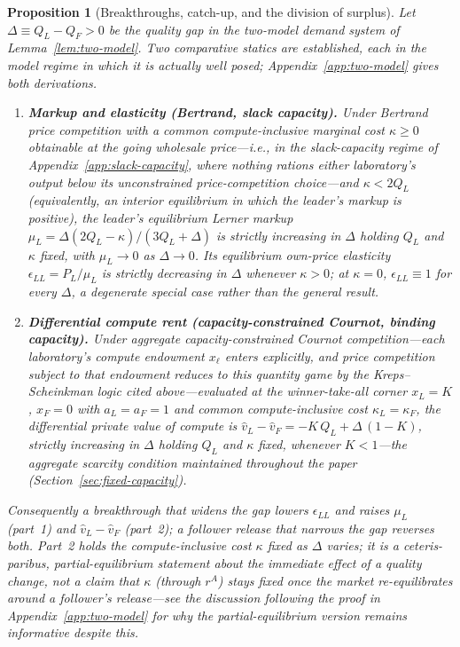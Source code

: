\documentclass[11pt]{article}
\newtheorem{proposition}{Proposition}
\begin{document}
\begin{proposition}[Breakthroughs, catch-up, and the division of surplus]\label{prop:breakthrough}
Let $\Delta\equiv Q_L-Q_F>0$ be the quality gap in the two-model demand system of Lemma~\ref{lem:two-model}. Two comparative statics are established, each in the model regime in which it is actually well posed; Appendix~\ref{app:two-model} gives both derivations.
\begin{enumerate}
\item \textbf{Markup and elasticity (Bertrand, slack capacity).} Under Bertrand price competition with a common compute-inclusive marginal cost $\kappa\geq0$ obtainable at the going wholesale price---i.e., in the slack-capacity regime of Appendix~\ref{app:slack-capacity}, where nothing rations either laboratory's output below its unconstrained price-competition choice---and $\kappa<2Q_L$ (equivalently, an interior equilibrium in which the leader's markup is positive), the leader's equilibrium Lerner markup $\mu_L=\Delta(2Q_L-\kappa)/(3Q_L+\Delta)$ is strictly increasing in $\Delta$ holding $Q_L$ and $\kappa$ fixed, with $\mu_L\to0$ as $\Delta\to0$. Its equilibrium own-price elasticity $\epsilon_{LL}=P_L/\mu_L$ is strictly decreasing in $\Delta$ whenever $\kappa>0$; at $\kappa=0$, $\epsilon_{LL}\equiv1$ for every $\Delta$, a degenerate special case rather than the general result.
\item \textbf{Differential compute rent (capacity-constrained Cournot, binding capacity).} Under aggregate capacity-constrained Cournot competition---each laboratory's compute endowment $x_\ell$ enters explicitly, and price competition subject to that endowment reduces to this quantity game by the Kreps--Scheinkman logic cited above---evaluated at the winner-take-all corner $x_L=K$, $x_F=0$ with $a_L=a_F=1$ and common compute-inclusive cost $\kappa_L=\kappa_F$, the differential private value of compute is $\widehat v_L-\widehat v_F=-K\,Q_L+\Delta\,(1-K)$, strictly increasing in $\Delta$ holding $Q_L$ and $\kappa$ fixed, whenever $K<1$---the aggregate scarcity condition maintained throughout the paper (Section~\ref{sec:fixed-capacity}).
\end{enumerate}
Consequently a breakthrough that widens the gap lowers $\epsilon_{LL}$ and raises $\mu_L$ (part~1) and $\widehat v_L-\widehat v_F$ (part~2); a follower release that narrows the gap reverses both. Part~2 holds the compute-inclusive cost $\kappa$ fixed as $\Delta$ varies; it is a ceteris-paribus, partial-equilibrium statement about the immediate effect of a quality change, not a claim that $\kappa$ (through $r^A$) stays fixed once the market re-equilibrates around a follower's release---see the discussion following the proof in Appendix~\ref{app:two-model} for why the partial-equilibrium version remains informative despite this.
\end{proposition}
\end{document}
